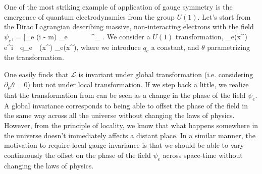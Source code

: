     One of the most striking example of application of gauge symmetry is the
    emergence of quantum electrodynamics from the group $U(1)$. Let's start from
    the Dirac Lagrangian describing massive, non-interacting electrons with the
    field $\psi_e$,
    {
        =
        \bar{\psi_e} (i \dslash - m) \psi_e
        \,\,\,\,\,\,\,
        \,\,\,\,\,\,\,
        \dslash {} \gamma^\mu \partial_\mu
        .
    }
    We consider a $U(1)$ transformation,
    {
        \psi_e(x^\mu)
        \rightarrow
        e^{i \,\cdot\, q_e \,\cdot\, \theta(x^\mu)} \psi_e(x^\mu),
    }
    where we introduce $q_e$ a constant, and $\theta$ parametrizing the
    transformation.

    One easily finds that $\mathcal{L}$ is invariant under global transformation
    (i.e.  considering $\partial_\mu \theta = 0$) but not under local
    transformation.  If we step back a little, we realize that the
    transformation from  can be seen as a change in the
    phase of the field $\psi_e$. A global invariance corresponds to being able
    to offset the phase of the field in the same way across all the universe
    without changing the laws of physics. However, from the principle of
    locality, we know that what happens somewhere in the universe doesn't
    immediately affects a distant place. In a similar manner, the motivation to
    require local gauge invariance is that we should be able to vary
    continuously the offset on the phase of the field $\psi_e$ across space-time
    without changing the laws of physics.

